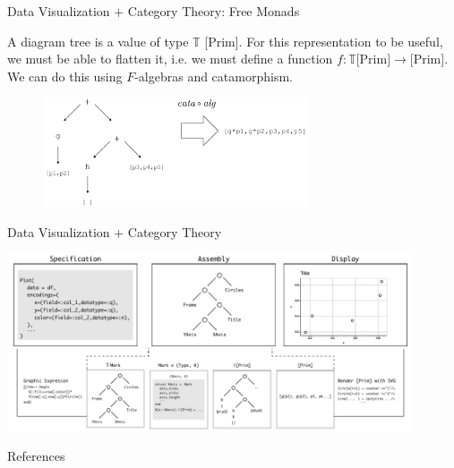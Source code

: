 \documentclass[aspectratio=169,xcolor=dvipsnames,10pt]{beamer}
\theoremstyle{definition}
\begin{document}
\begin{frame}[fragile]{Data Visualization + Category Theory: Free Monads}

    A diagram tree is a value of type $\mathbb T$ [Prim]. For this representation to
  be useful, we must be able to flatten it, i.e.
  we must define a function $f: \mathbb T\text{[Prim]} \to \text{[Prim]}$.
  We can do this using $F$-algebras and catamorphism.

  \begin{figure}
    \begin{center}
    \includegraphics[width=0.7\textwidth]{./figs/flattree.pdf}
    \end{center}
  \end{figure}
\end{frame}

\begin{frame}[fragile]{Data Visualization + Category Theory}
    \begin{center}
    \includegraphics[width=0.9\textwidth]{./figs/pipe.pdf}
    \end{center}
\end{frame}


\begin{frame}{References}
    \footnotesize
    
    
\end{frame}



\end{document}
